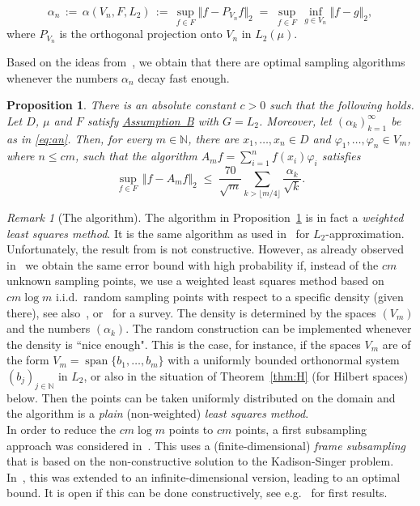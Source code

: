 \documentclass[a4paper,12pt]{amsart}
\newtheorem{prop}[theorem]{Proposition}
\theoremstyle{definition}
\theoremstyle{remark}
\newtheorem{remark}[theorem]{Remark}
\begin{document}
\begin{equation}\label{eq:an}
\alpha_n \,:=\, \alpha(V_n,F, L_2
) \,:=\, \sup_{f \in F} \Vert f - P_{V_n} f  \Vert_2
\;=\; \sup_{f \in F}\, \inf_{g\in V_n}\Vert f - g  \Vert_2, 
\end{equation}
where $P_{V_n}$ is the orthogonal projection onto $V_n$ in $L_2(\mu)$. 


Based on the ideas from~\cite{DKU}, we obtain that there are optimal sampling algorithms 
whenever the numbers $\alpha_n$ decay fast enough. 

\begin{prop}\label{prop:L2}
There is an absolute constant $c>0$ such that the following holds.
Let $D$, $\mu$ and $F$ satisfy \hyperlink{assum}{Assumption~B} with $G=L_2$. 
Moreover, let $(\alpha_k)_{k=1}^\infty$ be 
as in \eqref{eq:an}.
Then, for every $m\in\mathbb{N}$, there 
are $x_1,\dots,x_n\in D$ and $\varphi_1,\dots,\varphi_n\in V_m$, where $n\le cm$,
such that the algorithm $A_m
{f}
=\sum_{i=1}^n f(x_i) \varphi_i$ satisfies
\begin{equation*}%
\sup_{f\in F}\, \Vert f - A_m f \Vert_2 
\;\le\; \frac{70}{\sqrt{m}}\sum_{k > \lfloor m/4 \rfloor} \frac{ \alpha_k}{\sqrt{k}}.
\end{equation*}
\end{prop}


\begin{remark}[The algorithm] \label{rem:alg}
{The algorithm in Proposition~\ref{prop:L2}
is in fact a \emph{weighted least squares method}. It
is the same algorithm as used
in~\cite{DKU} for $L_2$-ap\-proxi\-mation.
Unfortunately,
the result from \cite{DKU} is not constructive.
However, as already observed in~\cite{KU1} we obtain the same error bound with high probability if, instead of the $cm$ unknown sampling points, we use a weighted least squares method based on $c m \log m$ i.i.d.\ random sampling points with respect to a specific density (given there), 
see also~\cite{KU2,MU,U2020}, 
or~\cite{SU23} for a survey.
The density is determined by the spaces $(V_m)$ and the numbers $(\alpha_k)$.
The random construction can be implemented whenever the density is ``nice enough".
This is the case, for instance, if the spaces $V_m$ are of the form $V_m = \operatorname{span}\{b_1,\hdots,b_m\}$ with a uniformly bounded orthonormal system $(b_j)_{j\in\mathbb{N}}$ in $L_2$,
or also in the situation of Theorem~\ref{thm:H} (for Hilbert spaces) below.
Then the points can be taken uniformly distributed on the domain and the algorithm is a \emph{plain} (non-weighted) \emph{least squares method}.}
\\
{In order to reduce the $cm\log m$ points to $cm$ points,}
a first subsampling approach 
was considered in~\cite{NSU}. 
This uses a (finite-dimensional) \emph{frame subsampling} 
that is based on 
the non-constructive solution to the Kadison-Singer problem. 
In~\cite{DKU}, this was extended to an infinite-dimensional version, 
leading to an optimal bound. 
It is open if this can be done constructively, 
see e.g.~\cite{BSU} for first results. 
\end{remark}
\end{document}
